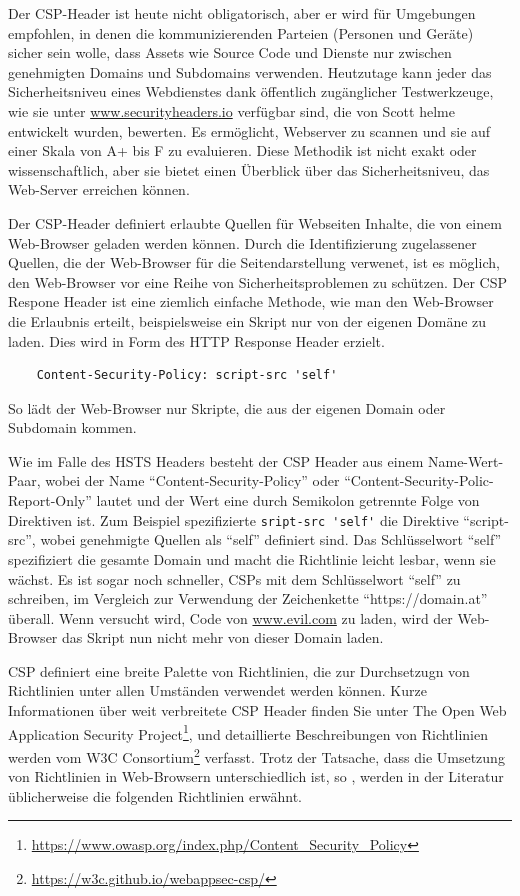 Der CSP-Header ist heute nicht obligatorisch, aber er wird für Umgebungen empfohlen, in denen die kommunizierenden Parteien (Personen und Geräte) sicher sein wolle, dass Assets wie Source Code und Dienste nur zwischen genehmigten Domains und Subdomains verwenden. Heutzutage kann jeder das Sicherheitsniveu eines Webdienstes dank öffentlich zugänglicher Testwerkzeuge, wie sie unter \url{www.securityheaders.io} verfügbar sind, die von Scott helme entwickelt wurden, bewerten. Es ermöglicht, Webserver zu scannen und sie auf einer Skala von A+ bis F zu evaluieren.
Diese Methodik ist nicht exakt oder wissenschaftlich, aber sie bietet einen Überblick über das Sicherheitsniveu, das Web-Server erreichen können. \autocite{dolnak2017}

Der CSP-Header definiert erlaubte Quellen für Webseiten Inhalte, die von einem  Web-Browser geladen werden können. Durch die Identifizierung zugelassener Quellen, die der Web-Browser für die Seitendarstellung verwenet, ist es möglich, den Web-Browser vor eine Reihe von Sicherheitsproblemen zu schützen. Der CSP Respone Header ist eine ziemlich einfache Methode, wie man den Web-Browser die Erlaubnis erteilt, beispielsweise ein Skript nur von der eigenen Domäne zu laden. Dies wird in Form des HTTP Response Header erzielt.
\begin{verbatim}
	Content-Security-Policy: script-src 'self'
\end{verbatim}
So lädt der Web-Browser nur Skripte, die aus der eigenen Domain oder Subdomain kommen.

Wie im Falle des HSTS Headers besteht der CSP Header aus einem Name-Wert-Paar, wobei der Name ``Content-Security-Policy'' oder ``Content-Security-Polic-Report-Only'' lautet und der Wert eine durch Semikolon getrennte Folge von Direktiven ist. Zum Beispiel spezifizierte \verb+sript-src 'self'+ die Direktive ``script-src'', wobei genehmigte Quellen als ``self'' definiert sind. Das Schlüsselwort ``self'' spezifiziert die gesamte Domain und macht die Richtlinie leicht lesbar, wenn sie wächst. Es ist sogar noch schneller, CSPs mit dem Schlüsselwort ``self'' zu schreiben, im Vergleich zur Verwendung der Zeichenkette ``https://domain.at'' überall. Wenn versucht wird, Code von \url{www.evil.com} zu laden, wird der Web-Browser das Skript nun nicht mehr von dieser Domain laden.

CSP definiert eine breite Palette von Richtlinien, die zur Durchsetzugn von Richtlinien unter allen Umständen verwendet werden können. Kurze Informationen über weit verbreitete CSP Header finden Sie unter The Open Web Application Security Project\footnote{\url{https://www.owasp.org/index.php/Content_Security_Policy}}, und detaillierte Beschreibungen von Richtlinien werden vom W3C Consortium\footnote{\url{https://w3c.github.io/webappsec-csp/}} verfasst. Trotz der Tatsache, dass die Umsetzung von Richtlinien in Web-Browsern unterschiedlich ist, so \textcite{helme2014}, werden in der Literatur üblicherweise die folgenden Richtlinien erwähnt.

